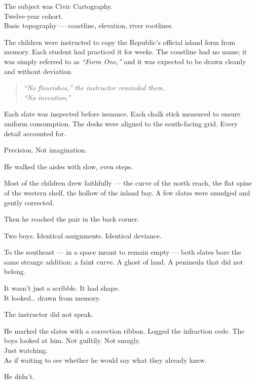 \documentclass[12pt]{article}
\begin{document}
The subject was Civic Cartography.\\
Twelve-year cohort.\\
Basic topography --- coastline, elevation, river rootlines.

The children were instructed to copy the Republic’s official island form from memory. Each student had practiced it for weeks. The coastline had no name; it was simply referred to as \textit{“Form One,”} and it was expected to be drawn cleanly and without deviation.

\begin{quote}
\textit{“No flourishes,” the instructor reminded them.} \\
\textit{“No invention.”}
\end{quote}

Each slate was inspected before issuance. Each chalk stick measured to ensure uniform consumption. The desks were aligned to the south-facing grid. Every detail accounted for.

Precision. Not imagination.

\vspace{1em}

He walked the aisles with slow, even steps.

Most of the children drew faithfully --- the curve of the north reach, the flat spine of the western shelf, the hollow of the inland bay. A few slates were smudged and gently corrected.

Then he reached the pair in the back corner.

Two boys. Identical assignments. Identical deviance.

To the southeast --- in a space meant to remain empty --- both slates bore the same strange addition: a faint curve. A ghost of land. A peninsula that did not belong.

It wasn’t just a scribble. It had shape.\\
It looked… drawn from memory.

\vspace{1em}

The instructor did not speak.

He marked the slates with a correction ribbon. Logged the infraction code. The boys looked at him. Not guiltily. Not smugly.\\
Just watching.\\
As if waiting to see whether he would say what they already knew.

He didn’t.
\end{document}

